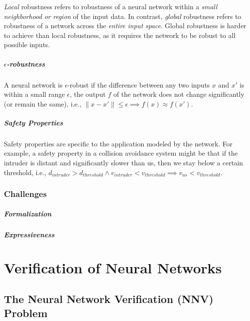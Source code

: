\documentclass[oneside,11pt,dvipsnames]{book}
\begin{document}
\emph{Local} robustness refers to robustness of a neural network within a \emph{small neighborhood or region} of the input data. In contrast, \emph{global} robustness refers to robustness of a network across the \emph{entire input space}. Global robustness is harder to achieve than local robustness, as it requires the network to be robust to all possible inputs.

\paragraph{$\epsilon$-robustness} A neural network is $\epsilon$-robust if the difference between any two inputs $x$ and $x'$ is within a small range $\epsilon$, the output $f$ of the network does not change significantly (or remain the same), i.e., $\|x-x'\| \leq \epsilon \implies f(x) \approx f(x')$.




\paragraph{Safety Properties} Safety properties are specific to the application modeled by the network. For example, a safety property in a collision avoidance system might be that if the intruder is distant and significantly slower than us, then we stay below a certain threshold, i.e., $d_{intruder} > d_{threshold} \land v_{intruder} < v_{threshold} \implies v_{us} < v_{threshold}$.


\subsection{Challenges}

\paragraph{Formalization}


\paragraph{Expressiveness}




\chapter{Verification of Neural Networks}\label{sec:verification}


\section{The Neural Network Verification (NNV) Problem}\label{sec:nnv-problem}
\end{document}
